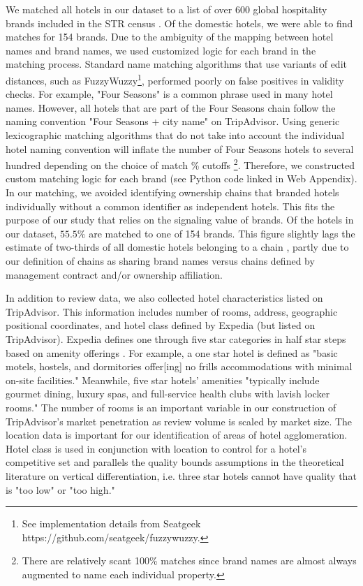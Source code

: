 \documentclass[mksc,blindrev]{informs3} %
\begin{document}
We matched all hotels in our dataset to a list of over 600 global hospitality brands included in the STR census \citep{hotelnews2015}. Of the domestic hotels, we were able to find matches for 154 brands. Due to the ambiguity of the mapping between hotel names and brand names, we used customized logic for each brand in the matching process. Standard name matching algorithms that use variants of edit distances, such as FuzzyWuzzy\footnote{See implementation details from Seatgeek https://github.com/seatgeek/fuzzywuzzy.}, performed poorly on false positives in validity checks. For example, "Four Seasons" is a common phrase used in many hotel names. However, all hotels that are part of the Four Seasons chain follow the naming convention "Four Seasons + city name" on TripAdvisor. Using generic lexicographic matching algorithms that do not take into account the individual hotel naming convention will inflate the number of Four Seasons hotels to several hundred depending on the choice of match \% cutoffs \footnote{There are relatively scant 100\% matches since brand names are almost always augmented to name each individual property.}. Therefore, we constructed custom matching logic for each brand (see Python code linked in Web Appendix). In our matching, we avoided identifying ownership chains that branded hotels individually without a common identifier as independent hotels. This fits the purpose of our study that relies on the signaling value of brands. Of the hotels in our dataset, $55.5\%$ are matched to one of 154 brands. This figure slightly lags the estimate of two-thirds of all domestic hotels belonging to a chain \citep{lodging2017}, partly due to our definition of chains as sharing brand names versus chains defined by management contract and/or ownership affiliation.

In addition to review data, we also collected hotel characteristics listed on TripAdvisor. This information includes number of rooms, address, geographic positional coordinates, and hotel class defined by Expedia (but listed on TripAdvisor). Expedia defines one through five star categories in half star steps based on amenity offerings \citep{expedia2018ratings}. For example, a one star hotel is defined as "basic motels, hostels, and dormitories offer[ing] no frills accommodations with minimal on-site facilities." Meanwhile, five star hotels' amenities "typically include gourmet dining, luxury spas, and full-service health clubs with lavish locker rooms." The number of rooms is an important variable in our construction of TripAdvisor's market penetration as review volume is scaled by market size. The location data is important for our identification of areas of hotel agglomeration. Hotel class is used in conjunction with location to control for a hotel's competitive set and parallels the quality bounds assumptions in the theoretical literature on vertical differentiation, i.e. three star hotels cannot have quality that is "too low" or "too high."
\end{document}
